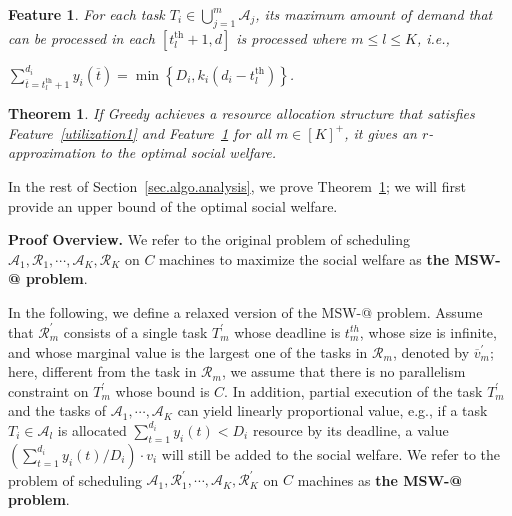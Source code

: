 \documentclass[10pt,journal,compsoc]{IEEEtran}
\makeatletter
\newtheorem{theorem}{\textbf{Theorem}}\newtheorem{definition}{\textbf{Definition}}\newtheorem{feature}{Feature}\newtheorem{proposition}{\textbf{Proposition}}\newtheorem{lemma}{Lemma}\newtheorem{assumption}{Assumption}\newtheorem{principle}{\textbf{Principle}}\newtheorem{observation}{\textbf{{\em Observation}}}\newtheorem{property}{\textbf{{\em Property}}}
\newcommand{\tth}{t^{\textrm{th}}}
\newcommand{\Rmnum}[1]{\expandafter\@slowromancap\romannumeral #1@}
\makeatother
\begin{document}
\begin{feature}\label{fully}
For each task $T_{i}\in \bigcup_{j=1}^{m}{\mathcal{A}_{j}}$, its maximum amount of demand that can be processed in each $\left[\tth_{l}+1, d \right]$ is processed where $m\leq l\leq K$, i.e.,
\begin{center}
$\sum\limits_{\overline{t}=\tth_{l}+1}^{d_{i}}{y_{i}(\overline{t})}=\min\left\{ D_{i}, k_{i}(d_{i}-\tth_{l}) \right\}$.
\end{center}
\end{feature}


\begin{theorem}\label{spaa}
If Greedy achieves a resource allocation structure that satisfies Feature~\ref{utilization1} and Feature~\ref{fully} for all $m\in [K]^{+}$, it gives an $r$-approximation to the optimal social welfare.
\end{theorem}






In the rest of Section~\ref{sec.algo.analysis}, we prove Theorem~\ref{spaa}; we will first provide an upper bound of the optimal social welfare.


\vspace{0.45em}\noindent\textbf{Proof Overview.} We refer to the original problem of scheduling $\mathcal{A}_1, \mathcal{R}_1, \cdots, \mathcal{A}_K, \mathcal{R}_{K}$ on $C$ machines to maximize the social welfare as \textbf{the MSW-\Rmnum{1} problem}.


In the following, we define a relaxed version of the MSW-\Rmnum{1} problem.
Assume that $\mathcal{R}_{m}^{\prime}$ consists of a single task $T_{m}^{\prime}$ whose deadline is $t_{m}^{th}$, whose size is infinite, and whose marginal value is the largest one of the tasks in $\mathcal{R}_{m}$, denoted by $\overline{v}_{m}^{\prime}$; here, different from the task in $\mathcal{R}_{m}$, we assume that there is no parallelism constraint on $T_{m}^{\prime}$ whose bound is $C$. In addition, partial execution of the task $T_{m}^{\prime}$ and the tasks of $\mathcal{A}_1, \cdots, \mathcal{A}_K$ can yield linearly proportional value, e.g., if a task $T_{i}\in \mathcal{A}_{l}$ is allocated $\sum_{t=1}^{d_{i}}{y_{i}(t)}<D_{i}$ resource by its deadline, a value $(\sum_{t=1}^{d_{i}}{y_{i}(t)}/D_{i})\cdot v_{i}$ will still be added to the social welfare. We refer to the problem of scheduling $\mathcal{A}_1, \mathcal{R}_1^{\prime}, \cdots, \mathcal{A}_K, \mathcal{R}_{K}^{\prime}$ on $C$ machines as \textbf{the MSW-\Rmnum{2} problem}.
\end{document}
